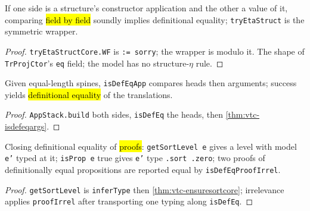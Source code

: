 \begin{lemma}
  \label{thm:vtc-tryetastruct}
  \leanok

   If one side is a structure's constructor application and the other a value of
  it, comparing \hl{field by field} soundly implies definitional equality; \texttt{tryEtaStruct}
  is the symmetric wrapper.
\end{lemma}
\begin{proof}
  \stSorry{} \texttt{tryEtaStructCore.WF} is \texttt{:= sorry}; the wrapper is modulo it.
   The shape of \texttt{TrProjCtor}'s \texttt{eq} field; the model has no
  structure-$\eta$ rule.
\end{proof}

\begin{lemma}
  \label{thm:vtc-isdefeqapp}
  \leanok

   Given equal-length spines, \texttt{isDefEqApp} compares heads then arguments;
  success yields \hl{definitional equality} of the translations.
\end{lemma}
\begin{proof}
  \leanok
   \texttt{AppStack.build} both sides, \texttt{isDefEq} the heads, then
  \ref{thm:vtc-isdefeqargs}.
\end{proof}

\begin{theorem}
  \label{thm:vtc-proofirrel}
  \leanok

   Closing definitional equality of \hl{proofs}: \texttt{getSortLevel e} gives a
  level with model \texttt{e'} typed at it; \texttt{isProp e} true gives \texttt{e'} type
  \texttt{.sort .zero}; two proofs of definitionally equal propositions are reported equal by
  \texttt{isDefEqProofIrrel}.
\end{theorem}
\begin{proof}
  \leanok
   \texttt{getSortLevel} is \texttt{inferType} then \ref{thm:vtc-ensuresortcore};
  irrelevance applies \texttt{proofIrrel} after transporting one typing along \texttt{isDefEq}.
\end{proof}

